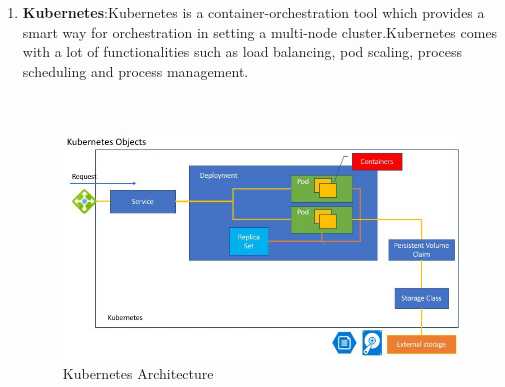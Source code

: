 \documentclass[11pt]{report}
\begin{document}
\begin{enumerate}
\begin{itemize}
			
		\end{itemize}
		\item
		\textbf{Kubernetes}:Kubernetes is a container-orchestration tool which provides a smart way for orchestration in setting a multi-node cluster.Kubernetes comes with a lot of functionalities such as load balancing, pod scaling, process scheduling and process management.
		\\
		\\
		\\
		\begin{figure}[h!]
    	\begin{center}
    		\includegraphics[scale=0.5]{kubernetes.jpeg}
    		\caption{Kubernetes Architecture \cite{kubearch}}
    	  \end{center}
	  

\end{figure}
\end{enumerate}
\end{document}

